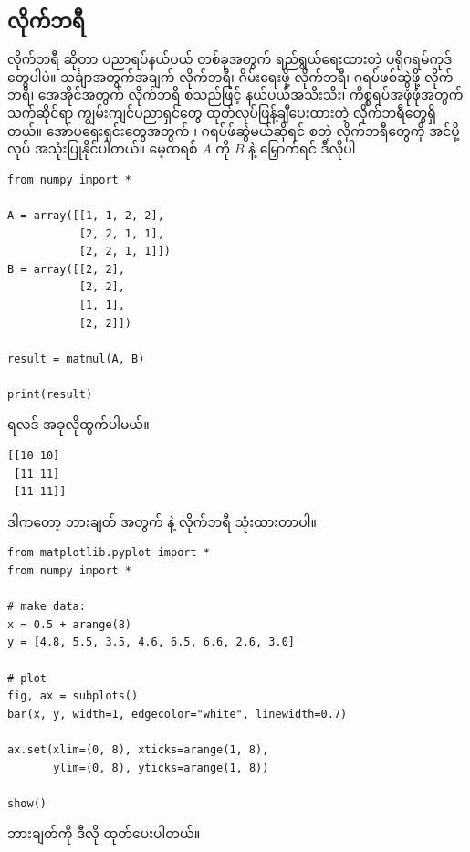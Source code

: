 \subsection*{လိုက်ဘရီ}
လိုက်ဘရီ  ဆိုတာ ပညာရပ်နယ်ပယ် တစ်ခုအတွက် ရည်ရွယ်ရေးထားတဲ့ ပရိုဂရမ်ကုဒ်တွေပါပဲ။ သင်္ချာအတွက်အချက် လိုက်ဘရီ၊ ဂိမ်းရေးဖို့ လိုက်ဘရီ၊  ဂရပ်ဖစ်ဆွဲဖို့ လိုက်ဘရီ၊ အေအိုင်အတွက် လိုက်ဘရီ စသည်ဖြင့် နယ်ပယ်အသီးသီး၊ ကိစ္စရပ်အဖုံဖုံအတွက် သက်ဆိုင်ရာ ကျွမ်းကျင်ပညာရှင်တွေ ထုတ်လုပ်ဖြန့်ချီပေးထားတဲ့ လိုက်ဘရီတွေရှိတယ်။  အော်ပရေးရှင်းတွေအတွက်  ၊ ဂရပ်ဖ်ဆွဲမယ်ဆိုရင်  စတဲ့ လိုက်ဘရီတွေကို အင်ပို့လုပ် အသုံးပြုနိုင်ပါတယ်။ မေ့ထရစ် $A$ ကို $B$ နဲ့ မြှောက်ရင် ဒီလိုပါ 
%
\setlength{\fboxsep}{0pt}
\begin{verbatim}
from numpy import *

A = array([[1, 1, 2, 2],
           [2, 2, 1, 1],
           [2, 2, 1, 1]])
B = array([[2, 2],
           [2, 2],
           [1, 1],
           [2, 2]])

result = matmul(A, B)

print(result)

\end{verbatim}
%
ရလဒ် အခုလိုထွက်ပါမယ်။ 
%
\begin{verbatim}
[[10 10]
 [11 11]
 [11 11]]
\end{verbatim}
%
ဒါကတော့ ဘားချတ် အတွက်  နဲ့  လိုက်ဘရီ သုံးထားတာပါ။  
%
\setlength{\fboxsep}{0pt}
\begin{verbatim}
from matplotlib.pyplot import *
from numpy import *

# make data:
x = 0.5 + arange(8)
y = [4.8, 5.5, 3.5, 4.6, 6.5, 6.6, 2.6, 3.0]

# plot
fig, ax = subplots()
bar(x, y, width=1, edgecolor="white", linewidth=0.7)

ax.set(xlim=(0, 8), xticks=arange(1, 8),
       ylim=(0, 8), yticks=arange(1, 8))

show()
\end{verbatim}
ဘားချတ်ကို ဒီလို ထုတ်ပေးပါတယ်။
%
